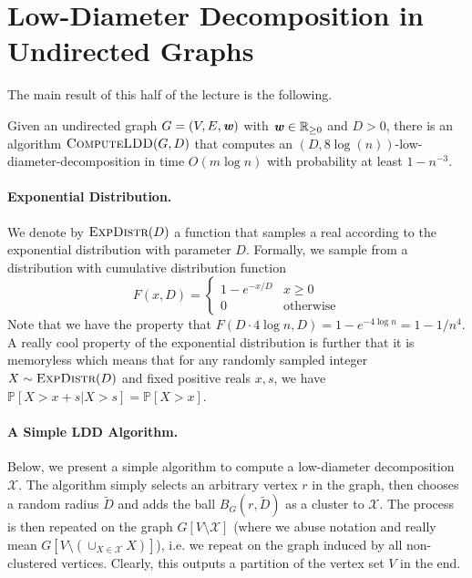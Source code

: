 \section{Low-Diameter Decomposition in Undirected Graphs}

The main result of this half of the lecture is the following.

\begin{theorem}\label{thm:computeLDDguarantees}
Given an undirected graph $G = (V,E,\boldsymbol{\mathit{w}})$ with $\boldsymbol{\mathit{w}} \in \mathbb{R}_{\geq 0}$ and $D > 0$, there is an algorithm $\textsc{ComputeLDD}(G, D)$ that computes an $(D,  8 \log(n))$-low-diameter-decomposition in time $O(m \log n)$ with probability at least $1-n^{-3}$. 
\end{theorem}

\paragraph{Exponential Distribution.} We denote by $\textsc{ExpDistr}(D)$ a function that samples a real according to the exponential distribution with parameter $D$.  Formally, we sample from a distribution with cumulative distribution function
\[
	F(x, D) = \begin{cases} 1 - e^{-x/D} & x \geq 0 \\ 0 & \text{otherwise} \end{cases}
\]
Note that we have the property that $F(D \cdot 4\log n,  D) = 1 - e^{-4\log n} = 1-1/n^4$.  A really cool property of the exponential distribution is further that it is memoryless which means that for any randomly sampled integer $X \sim \textsc{ExpDistr}(D)$ and fixed positive reals $x,s$, we have $\mathbb{P}[X > x + s | X > s] = \mathbb{P}[X > x]$.

\paragraph{A Simple LDD Algorithm.} Below, we present a simple algorithm to compute a low-diameter decomposition $\mathcal{X}$. The algorithm simply selects an arbitrary vertex $r$ in the graph, then chooses a random radius $\tilde{D}$ and adds the ball $B_{G}(r, \tilde{D})$ as a cluster to $\mathcal{X}$. The process is then repeated on the graph $G[V \setminus \mathcal{X}]$ (where we abuse notation and really mean $G[V \setminus (\cup_{X \in \mathcal{X}} X)]$), i.e. we repeat on the graph induced by all non-clustered vertices. Clearly, this outputs a partition of the vertex set $V$ in the end.


